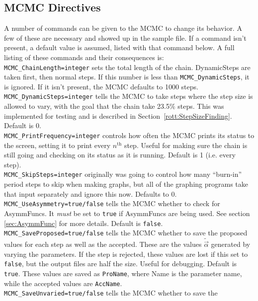 \subsection{MCMC Directives}
\label{sec:MCMCDirectives}
A number of commands can be given to the MCMC to change its behavior.
A few of these are necessary and showed up in the sample file.  If a
command isn't present, a default value is assumed, listed with that
command below.  A full listing of these commands and their
consequences is:\medskip\\
\verb|MCMC_ChainLength=integer| sets the total length of the chain.
DynamicSteps are taken first, then normal steps.  If this number is
less than \verb|MCMC_DynamicSteps|, it is ignored.  If it isn't
present, the MCMC defaults to 1000 steps.\medskip\\
\verb|MCMC_DynamicSteps=integer| tells the MCMC to take steps where
the step size is allowed to vary, with the goal that the chain take
23.5\% steps.  This was implemented for testing and is described
in \mbox{Section \ref{rott:StepSizeFinding}}.  Default is 0.\medskip\\
\verb|MCMC_PrintFrequency=integer| controls how often the MCMC prints
its status to the screen, setting it to print every $n^{\mathrm{th}}$
step.  Useful for making sure the chain is still going and checking on
its status as it is running.  Default is 1
(i.e.  every step).\medskip\\
\verb|MCMC_SkipSteps=integer| originally was going to control how many
``burn-in'' period steps to skip when making graphs, but all of the
graphing programs take that input separately and ignore this now.
Defaults to 0.\medskip\\
\verb|MCMC_UseAsymmetry=true/false| tells the MCMC whether to check
for AsymmFuncs.  It \emph{must} be set to \verb|true| if AsymmFuncs
are being used.  See section \ref{sec:AsymmFunc} for more details.
Default is \verb|false|.\medskip\\
\verb|MCMC_SaveProposed=true/false| tells the MCMC whether to save the
proposed values for each step as well as the accepted.  These are the
values $\tilde{\vec{\alpha}}$ generated by varying the parameters.  If
the step is rejected, these values are lost if this set to
\verb|false|, but the output files are half the size.  Useful for
debugging.  Default is \verb|true|.  These values are saved as
\verb|ProName|, where Name is the parameter name, while the accepted
values are \verb|AccName|.\medskip\\
\verb|MCMC_SaveUnvaried=true/false| tells the MCMC whether to save the
